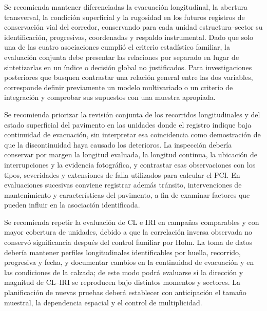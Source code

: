 \begingroup
\setlength{\emergencystretch}{2em}


Se recomienda mantener diferenciadas la evacuación longitudinal, la abertura transversal, la condición superficial y la rugosidad en los futuros registros de conservación vial del corredor, conservando para cada unidad estructura--sector su identificación, progresivas, coordenadas y respaldo instrumental. Dado que solo una de las cuatro asociaciones cumplió el criterio estadístico familiar, la evaluación conjunta debe presentar las relaciones por separado en lugar de sintetizarlas en un índice o decisión global no justificados. Para investigaciones posteriores que busquen contrastar una relación general entre las dos variables, corresponde definir previamente un modelo multivariado o un criterio de integración y comprobar sus supuestos con una muestra apropiada.


Se recomienda priorizar la revisión conjunta de los recorridos longitudinales y del estado superficial del pavimento en las unidades donde el registro indique baja continuidad de evacuación, sin interpretar esa coincidencia como demostración de que la discontinuidad haya causado los deterioros. La inspección debería conservar por margen la longitud evaluada, la longitud continua, la ubicación de interrupciones y la evidencia fotográfica, y contrastar esas observaciones con los tipos, severidades y extensiones de falla utilizados para calcular el PCI. En evaluaciones sucesivas conviene registrar además tránsito, intervenciones de mantenimiento y características del pavimento, a fin de examinar factores que pueden influir en la asociación identificada.


Se recomienda repetir la evaluación de CL e IRI en campañas comparables y con mayor cobertura de unidades, debido a que la correlación inversa observada no conservó significancia después del control familiar por Holm. La toma de datos debería mantener perfiles longitudinales identificables por huella, recorrido, progresiva y fecha, y documentar cambios en la continuidad de evacuación y en las condiciones de la calzada; de este modo podrá evaluarse si la dirección y magnitud de CL--IRI se reproducen bajo distintos momentos y sectores. La planificación de nuevas pruebas deberá establecer con anticipación el tamaño muestral, la dependencia espacial y el control de multiplicidad.

